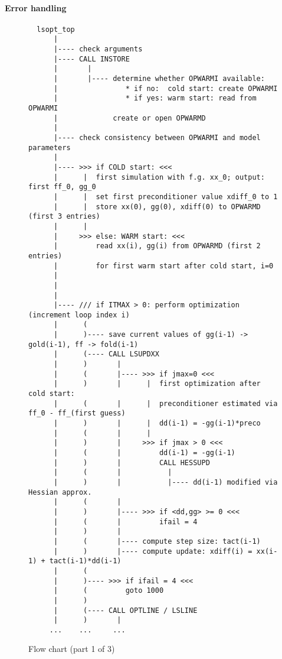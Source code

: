 \paragraph{Error handling}



\newpage

\begin{figure}
%
{\scriptsize
\begin{verbatim}
  lsopt_top
      |
      |---- check arguments
      |---- CALL INSTORE
      |       |
      |       |---- determine whether OPWARMI available:
      |                * if no:  cold start: create OPWARMI
      |                * if yes: warm start: read from OPWARMI
      |             create or open OPWARMD
      |
      |---- check consistency between OPWARMI and model parameters
      | 
      |---- >>> if COLD start: <<<
      |      |  first simulation with f.g. xx_0; output: first ff_0, gg_0
      |      |  set first preconditioner value xdiff_0 to 1
      |      |  store xx(0), gg(0), xdiff(0) to OPWARMD (first 3 entries)
      |      |
      |     >>> else: WARM start: <<<
      |         read xx(i), gg(i) from OPWARMD (first 2 entries)
      |         for first warm start after cold start, i=0
      |
      |
      |
      |---- /// if ITMAX > 0: perform optimization (increment loop index i)
      |      (
      |      )---- save current values of gg(i-1) -> gold(i-1), ff -> fold(i-1)
      |      (---- CALL LSUPDXX
      |      )       |
      |      (       |---- >>> if jmax=0 <<<
      |      )       |      |  first optimization after cold start:
      |      (       |      |  preconditioner estimated via ff_0 - ff_(first guess)
      |      )       |      |  dd(i-1) = -gg(i-1)*preco
      |      (       |      |  
      |      )       |     >>> if jmax > 0 <<<
      |      (       |         dd(i-1) = -gg(i-1)
      |      )       |         CALL HESSUPD
      |      (       |           |
      |      )       |           |---- dd(i-1) modified via Hessian approx.
      |      (       |
      |      )       |---- >>> if <dd,gg> >= 0 <<<
      |      (       |         ifail = 4
      |      )       |
      |      (       |---- compute step size: tact(i-1)
      |      )       |---- compute update: xdiff(i) = xx(i-1) + tact(i-1)*dd(i-1)
      |      (
      |      )---- >>> if ifail = 4 <<<
      |      (         goto 1000
      |      )
      |      (---- CALL OPTLINE / LSLINE
      |      )       |
     ...    ...     ...
\end{verbatim}
}
\caption{Flow chart (part 1 of 3)}
\label{fig:lsoptflow1}
\end{figure}


